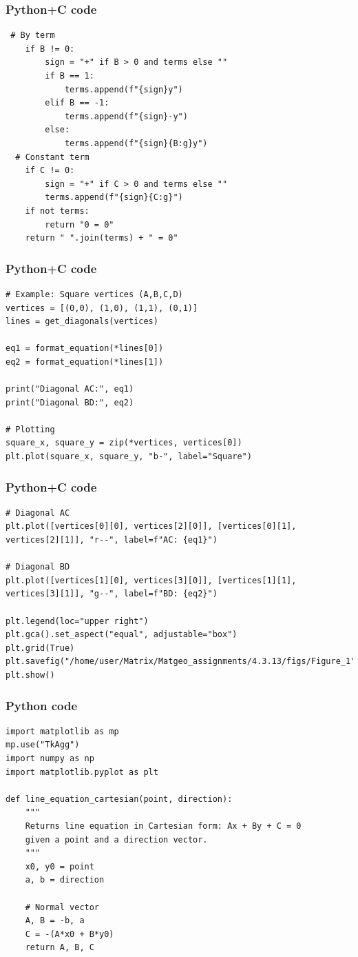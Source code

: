 \documentclass{beamer}
\begin{document}
\begin{frame}[fragile]
    \frametitle{Python+C code}

    \begin{lstlisting}
 # By term
    if B != 0:
        sign = "+" if B > 0 and terms else ""
        if B == 1:
            terms.append(f"{sign}y")
        elif B == -1:
            terms.append(f"{sign}-y")
        else:
            terms.append(f"{sign}{B:g}y")
  # Constant term
    if C != 0:
        sign = "+" if C > 0 and terms else ""
        terms.append(f"{sign}{C:g}")
    if not terms:
        return "0 = 0"
    return " ".join(terms) + " = 0"
    \end{lstlisting}
\end{frame}

\begin{frame}[fragile]
    \frametitle{Python+C code}

    \begin{lstlisting}
# Example: Square vertices (A,B,C,D)
vertices = [(0,0), (1,0), (1,1), (0,1)]
lines = get_diagonals(vertices)

eq1 = format_equation(*lines[0])
eq2 = format_equation(*lines[1])

print("Diagonal AC:", eq1)
print("Diagonal BD:", eq2)

# Plotting
square_x, square_y = zip(*vertices, vertices[0])
plt.plot(square_x, square_y, "b-", label="Square")
    \end{lstlisting}
\end{frame}

\begin{frame}[fragile]
    \frametitle{Python+C code}

    \begin{lstlisting}
# Diagonal AC
plt.plot([vertices[0][0], vertices[2][0]], [vertices[0][1], vertices[2][1]], "r--", label=f"AC: {eq1}")

# Diagonal BD
plt.plot([vertices[1][0], vertices[3][0]], [vertices[1][1], vertices[3][1]], "g--", label=f"BD: {eq2}")

plt.legend(loc="upper right")
plt.gca().set_aspect("equal", adjustable="box")
plt.grid(True)
plt.savefig("/home/user/Matrix/Matgeo_assignments/4.3.13/figs/Figure_1")
plt.show()
    \end{lstlisting}
\end{frame}

\begin{frame}[fragile]
    \frametitle{Python code}

    \begin{lstlisting}
import matplotlib as mp
mp.use("TkAgg")
import numpy as np
import matplotlib.pyplot as plt

def line_equation_cartesian(point, direction):
    """
    Returns line equation in Cartesian form: Ax + By + C = 0
    given a point and a direction vector.
    """
    x0, y0 = point
    a, b = direction
    
    # Normal vector
    A, B = -b, a
    C = -(A*x0 + B*y0)
    return A, B, C
    \end{lstlisting}
\end{frame}
\end{document}
